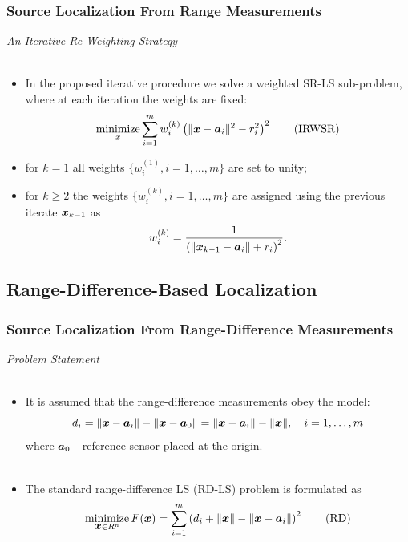 \documentclass [t] {beamer} %
\begin{document}
\begin{frame}%
\frametitle{Source Localization From Range Measurements}
{\large \textit{An Iterative Re-Weighting Strategy}} 
\\~\\
\normalsize

\begin{itemize}
\item 
 In the proposed iterative procedure we solve a weighted SR-LS sub-problem, where at each iteration the weights are fixed:
\begin{equation} \label{IRWSR}
\mathop{\mbox{minimize}}_{x} \sum_{i=1}^m w_i^{(k)}\left(\|\mbox{\boldmath$x$}-\mbox{\boldmath$a$}_i\|^2-r_i^2\right)^2 \tag{IRWSR}
\end{equation}
\item 
 for $k=1$ all weights $\{w_i^{(1)}, i=1,\ldots, m\}$ are set to unity; \\
 \item 
 for $k\geq2$ the weights $\{w_i^{(k)},i=1,\ldots,m\}$ are assigned using the previous iterate $\mbox{\boldmath$x$}_{k-1}$ as
\begin{equation} 
\nonumber
w_i^{(k)}=\frac{1}{\left(\|\mbox{\boldmath$x$}_{k-1}-\mbox{\boldmath$a$}_i\|+r_i\right)^2}.
\end{equation}

\end{itemize}
\end{frame}



\subsection{Range-Difference-Based Localization} %


\begin{frame} %
\frametitle{Source Localization From Range-Difference Measurements} %
{\large \textit{Problem Statement}}
\\~\\
\normalsize
\begin{itemize}
\item 
It is assumed that the range-difference measurements obey the model:
 \begin{equation} 
 \nonumber
 d_i=\|\mbox{\boldmath$x$}-\mbox{\boldmath$a$}_i\|-\|\mbox{\boldmath$x$}-\mbox{\boldmath$a$}_0\|=\|\mbox{\boldmath$x$}-\mbox{\boldmath$a$}_i\|-\|\mbox{\boldmath$x$}\|, \quad i = 1,\ldots,m
 \end{equation}
where $\mbox{\boldmath$a$}_0$ - reference sensor placed at the origin.\\~\\
 \item 
 The standard range-difference LS (RD-LS) problem is formulated as
 \begin{equation} \label{RD}
\mathop{\mbox{minimize}}_{\mbox{\boldmath$x$} \in R^n} F(\mbox{\boldmath$x$})=\sum_{i=1}^m \left(d_i+\|\mbox{\boldmath$x$}\|-\|\mbox{\boldmath$x$}-\mbox{\boldmath$a$}_i\|\right)^2 \tag{RD}
 \end{equation}
 \end{itemize}
\end{frame}
\end{document}
